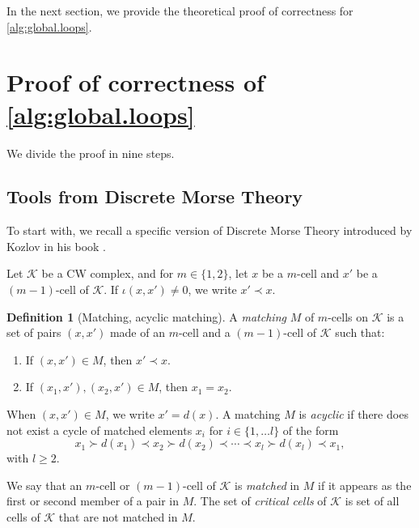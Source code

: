 \documentclass[a4paper,twoside,10pt]{article}
\theoremstyle{plain}
\theoremstyle{definition}
\newtheorem{definition}{Definition}[section]
\theoremstyle{remark}
\newcommand{\mc}{\mathcal}
\newcommand{\K}{\mc{K}}
\begin{document}
In the next section, we provide the theoretical proof of correctness for \cref{alg:global.loops}.
\section{Proof of correctness of \cref{alg:global.loops}}
\label{sec:proof}
We divide the proof in nine steps.
\subsection{Tools from Discrete Morse Theory}
To start with, we recall a specific version of Discrete Morse Theory introduced by Kozlov in his book \cite{Kozlov2008}.

Let $\K$ be a CW complex, and for $m \in \{1, 2\}$, let $x$ be a $m$-cell and $x'$ be a $(m-1)$-cell of $\K$.
If $\iota(x,x')\neq 0$, we write $x' \prec x$.
\begin{definition}[Matching, acyclic matching]
\label{def:matching}
A \emph{matching} $M$ of $m$-cells on $\K$ is a set of pairs $(x,x')$ made of an $m$-cell and a $(m-1)$-cell of $\K$ such that:
\begin{enumerate}[label=(\roman*)]
\item If $(x,x') \in M$, then $x' \prec x$.
\item If $(x_1, x'), (x_2, x') \in M$, then $x_1 = x_2$.
\end{enumerate}
When $(x,x') \in M$, we write $x' = d(x)$.
A matching $M$ is \emph{acyclic} if there does not exist a cycle of matched elements $x_i$ for $i \in \{1, \dots l\}$ of the form
\begin{equation*}
x_1 \succ d(x_1) \prec x_2 \succ d(x_2) \prec \cdots \prec x_l \succ d(x_l) \prec x_1,
\end{equation*}
with $l \geq 2$.
\end{definition}

We say that an $m$-cell or $(m-1)$-cell of $\K$ is \emph{matched} in $M$ if it appears as the first or second member of a pair in $M$.
The set of \emph{critical cells} of $\K$ is set of all cells of $\K$ that are not matched in $M$.
\end{document}
